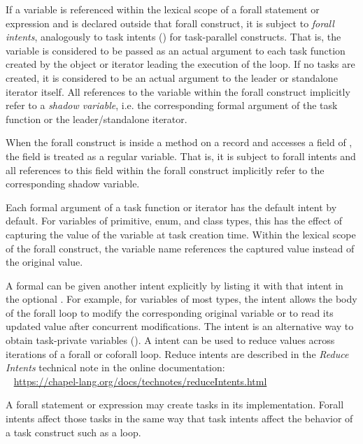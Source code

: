 If a variable is referenced within the lexical scope of a
forall statement or expression and is declared outside
that forall construct, it is subject to \emph{forall intents},
analogously to task intents ()
for task-parallel constructs. That is, the variable is considered
to be passed as an actual argument to
each task function created by the object or iterator leading
the execution of the loop. If no tasks are created,
it is considered to be an actual argument to the leader or standalone
iterator itself. All references to the variable within the forall construct
implicitly refer to a \emph{shadow variable}, i.e.
the corresponding formal argument of the task function
or the leader/standalone iterator.

When the forall construct is inside a method on a record and accesses
a field of , the field is treated as a regular variable.
That is, it is subject to forall intents and all references to this field
within the forall construct implicitly refer to the corresponding
shadow variable.

Each formal argument of a task function or iterator has the default
intent by default.  For variables of primitive, enum, and class
types, this has the effect of capturing the value of the
variable at task creation time.  Within the lexical scope of the
forall construct, the variable name references the
captured value instead of the original value.

A formal can be given another intent explicitly by listing it
with that intent in the optional .
For example, for variables of most types, the  intent allows
the body of the forall loop to modify the corresponding original
variable or to read its updated value after concurrent modifications.
The  intent is an alternative way to obtain task-private
variables ().
A  intent can be used to reduce values across iterations
of a forall or coforall loop.
Reduce intents are described in the \emph{Reduce Intents} technical note
in the online documentation:
\\ %
\mbox{$$ $$ $$} %
\url{https://chapel-lang.org/docs/technotes/reduceIntents.html}

\begin{rationale}
A forall statement or expression may create tasks in its implementation.
Forall intents affect those tasks in the same way that task intents
affect the behavior of a task construct such as a  loop.
\end{rationale}


